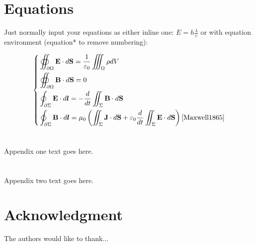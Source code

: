 \documentclass{wsdpp}
\begin{document}
\chapter{Equations}
Just normally input your equations as either inline one: $E=h\frac{\lambda}{c}$ or with equation environment (equation* to remove numbering):

\begin{equation}
\left\{
\begin{aligned}
    &\oiint_{\partial\Omega}{\mathbf{E}\cdot d\mathbf{S}}=\frac 1{\varepsilon_0}\iiint_\Omega{\rho dV}\\
    &\oiint_{\partial\Omega}{\mathbf{B}\cdot d\mathbf{S}}=0\\
    &\oint_{\partial\Sigma}{\mathbf{E}\cdot d\boldsymbol{l}}=-\frac d{dt} \iint_\Sigma{{\mathbf{B}\cdot d\mathbf{S}}}\\
    &\oint_{\partial\Sigma}{\mathbf{B}\cdot d\boldsymbol{l}}=\mu_0 \left(\iint_\Sigma{{\mathbf{J}\cdot d\mathbf{S}}}+\varepsilon_0\frac d{dt} \iint_\Sigma{{\mathbf{E}\cdot d\mathbf{S}}}\right)\cite{Maxwell1865}
\end{aligned}
\right.
\end{equation}

\newpage %

\begin{appendices}
\chapter{}
Appendix one text goes here.

\chapter{}
Appendix two text goes here.

\newpage %
\end{appendices}

\chapter*{Acknowledgment}
The authors would like to thank...

\newpage





\rhead{\small\sffamily\bfseries \bibname}
\end{document}
